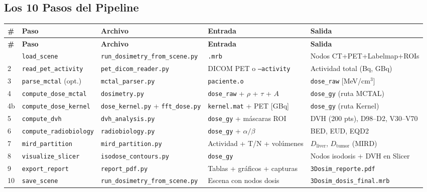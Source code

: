 \documentclass[12pt,a4paper]{article}
\begin{document}
\subsection{Los 10 Pasos del Pipeline}

\begin{longtable}{p{0.5cm} p{2.5cm} p{3cm} p{4cm} p{4cm}}
\toprule
\textbf{\#} & \textbf{Paso} & \textbf{Archivo} & \textbf{Entrada} & \textbf{Salida} \\
\midrule
\endfirsthead
\toprule
\textbf{\#} & \textbf{Paso} & \textbf{Archivo} & \textbf{Entrada} & \textbf{Salida} \\
\midrule
\endhead
\bottomrule
\endfoot
1 & \texttt{load\_scene} & \texttt{run\_dosimetry\_from\_scene.py} & \texttt{.mrb} & Nodos CT+PET+Labelmap+ROIs \\
2 & \texttt{read\_pet\_activity} & \texttt{pet\_dicom\_reader.py} & DICOM PET o \texttt{--activity} & Actividad total (Bq, GBq) \\
3 & \texttt{parse\_mctal} (opt.) & \texttt{mctal\_parser.py} & \texttt{paciente.o} & \texttt{dose\_raw} [MeV/cm$^3$] \\
4 & \texttt{compute\_dose\_mctal} & \texttt{dosimetry.py} & \texttt{dose\_raw} + $\rho$ + $\tau$ + $A$ & \texttt{dose\_gy} (ruta MCTAL) \\
4b & \texttt{compute\_dose\_kernel} & \texttt{dose\_kernel.py} + \texttt{fft\_dose.py} & \texttt{kernel.mat} + PET [GBq] & \texttt{dose\_gy} (ruta Kernel) \\
5 & \texttt{compute\_dvh} & \texttt{dvh\_analysis.py} & \texttt{dose\_gy} + máscaras ROI & DVH (200 pts), D98--D2, V30--V70 \\
6 & \texttt{compute\_radiobiology} & \texttt{radiobiology.py} & \texttt{dose\_gy} + $\alpha/\beta$ & BED, EUD, EQD2 \\
7 & \texttt{mird\_partition} & \texttt{mird\_partition.py} & Actividad + T/N + volúmenes & $D_{\text{liver}}$, $D_{\text{tumor}}$ (MIRD) \\
8 & \texttt{visualize\_slicer} & \texttt{isodose\_contours.py} & \texttt{dose\_gy} & Nodos isodosis + DVH en Slicer \\
9 & \texttt{export\_report} & \texttt{report\_pdf.py} & Tablas + gráficos + capturas & \texttt{3Dosim\_reporte.pdf} \\
10 & \texttt{save\_scene} & \texttt{run\_dosimetry\_from\_scene.py} & Escena con nodos dosis & \texttt{3Dosim\_dosis\_final.mrb} \\
\end{longtable}
\end{document}
